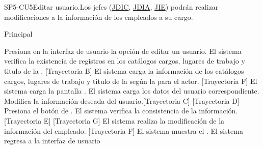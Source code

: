 \begin{UseCase}{SP5-CU5}{Editar usuario.}{Los jefes (\hyperlink{JDIC}{JDIC}, \hyperlink{JDIA}{JDIA}, \hyperlink{JIE}{JIE}) podrán realizar modificaciones a la información de los empleados a su cargo.}
{\begin{itemize}
		\end{itemize}
	}
	
\end{UseCase}

\begin{UCtrayectoria}{Principal}
	
	\UCpaso[\UCactor] Presiona en la interfaz de usuario  la opción de editar un usuario. 
	\UCpaso  El sistema verifica la existencia de registros en los catálogos cargos, lugares de trabajo y titulo de la  . [Trayectoria B] 
	\UCpaso El sistema carga la información de los catálogos cargos, lugares de trabajo y titulo de la  según la  para el actor. [Trayectoria F]
	\UCpaso El sistema carga la pantalla  . 
	\UCpaso El sistema carga los datos del usuario correspondiente. 
	\UCpaso[\UCactor] Modifica la información deseada del usuario.[Trayectoria C] [Trayectoria D]
	\UCpaso[\UCactor]  Presiona el botón de .
	\UCpaso El sistema verifica la consistencia de la información. [Trayectoria E] [Trayectoria G]
	\UCpaso El sistema realiza la modificación de la información del empleado. [Trayectoria F] 
	\UCpaso  El sistema muestra el .    
	\UCpaso El sistema regresa a la interfaz de usuario 
\end{UCtrayectoria}


